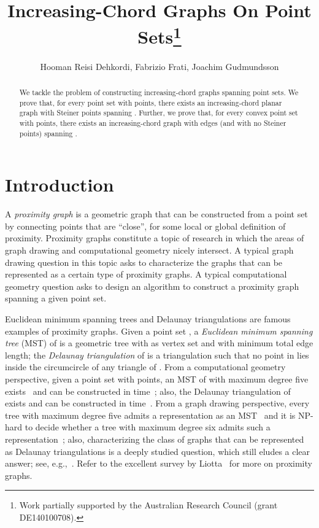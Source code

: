 \documentclass{llncs}
\title{Increasing-Chord Graphs On Point Sets\thanks{Work partially supported by the Australian Research Council (grant DE140100708).}}
\date{}
\author{Hooman Reisi Dehkordi, Fabrizio Frati, Joachim Gudmundsson
\institute{
 School of Information Technologies -- Monash University\\
\email{hooman.dehkordi@monash.edu}\\
 School of Information Technologies -- The University of Sydney\\
\email{\{fabrizio.frati,joachim.gudmundsson\}@sydney.edu.au}}}
\begin{document}
\maketitle

\begin{abstract}
We tackle the problem of constructing increasing-chord graphs spanning point sets. We prove that, for every point set  with  points, there exists an increasing-chord planar graph with  Steiner points spanning . Further, we prove that, for every convex point set  with  points, there exists an increasing-chord graph with  edges (and with no Steiner points) spanning .
\end{abstract}

\section{Introduction} \label{se:introduction}

A {\em proximity graph} is a geometric graph that can be constructed from a point set by connecting points that are ``close'', for some local or global definition of proximity. Proximity graphs constitute a topic of research in which the areas of graph drawing and computational geometry nicely intersect. A typical graph drawing question in this topic asks to characterize the graphs that can be represented as a certain type of proximity graphs. A typical computational geometry question asks to design an algorithm to construct a proximity graph spanning a given point set.

Euclidean minimum spanning trees and Delaunay triangulations are famous examples of proximity graphs. Given a point set , a {\em Euclidean minimum spanning tree} (MST) of  is a geometric tree with  as vertex set and with minimum total edge length; the {\em Delaunay triangulation} of  is a triangulation  such that no point in  lies inside the circumcircle of any triangle of . From a computational geometry perspective, given a point set  with  points, an MST of  with maximum degree five exists~\cite{MonmaS92} and can be constructed in  time~\cite{bcko-cgta-08}; also, the Delaunay triangulation of  exists and can be constructed in  time~\cite{bcko-cgta-08}. From a graph drawing perspective, every tree with maximum degree five admits a representation as an MST~\cite{MonmaS92} and it is NP-hard to decide whether a tree with maximum degree six admits such a representation~\cite{EadesW96}; also, characterizing the class of graphs that can be represented as Delaunay triangulations is a deeply studied question, which still eludes a clear answer; see, e.g.,~\cite{dv-aptg-96,ds-gtcidr-96}. Refer to the excellent survey by Liotta~\cite{gd-handbook} for more on proximity graphs.
\end{document}
